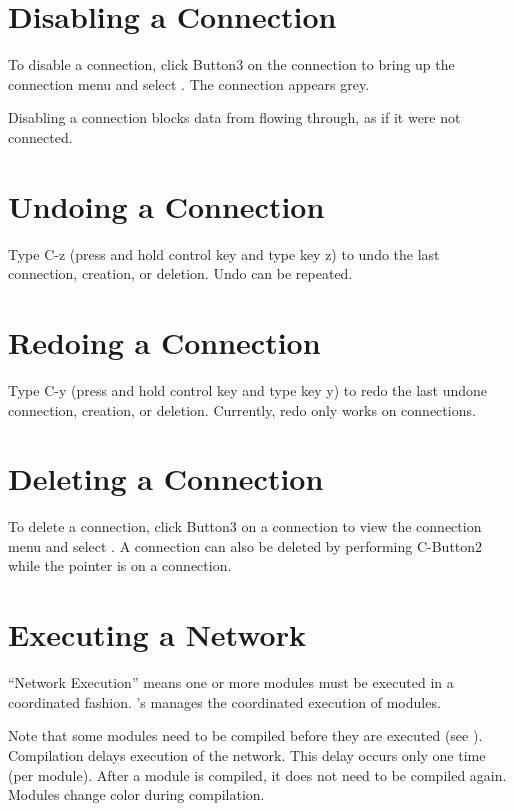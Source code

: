 \section{Disabling a Connection}
\label{sec:disableconnect}

To disable a connection, click Button3 on the connection to
bring up the connection menu and select . The
connection appears grey.

Disabling a connection blocks data from flowing through, as if it were
not connected.

\section{Undoing a Connection}
\label{sec:undomod}

Type C-z (press and hold control key and type key z) to undo the last
connection, creation, or deletion.  Undo can be repeated.

\section{Redoing a Connection}
Type C-y (press and hold control key and type key y) to redo the last
undone connection, creation, or deletion. Currently, redo only works
on connections.
 
\section{Deleting a Connection}
\label{sec:deleteconnections}

To delete a connection, click Button3 on a connection to view the
connection menu and select . A connection can also be
deleted by performing C-Button2 while the pointer is on a
connection.

\section{Executing a Network}
\label{sec:executenet}

``Network Execution'' means one or more modules must be executed in a
coordinated fashion. 
\sr{}'s  manages the coordinated execution of modules.

Note that some modules need to be compiled before they are
executed (see ).  Compilation
delays execution of the network.  This delay occurs only one time
(per module).  After a module is compiled, it does not need to be
compiled again.  Modules change color during compilation.

